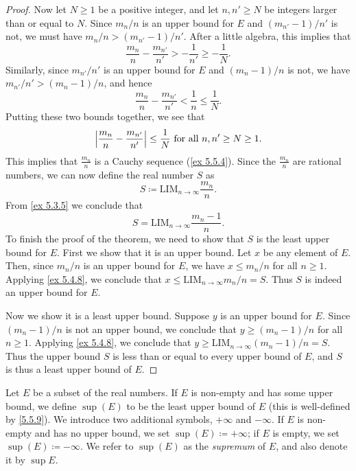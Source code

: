 \begin{proof}
  Now let \(N \geq 1\) be a positive integer, and let \(n, n' \geq N\) be integers larger than or equal to \(N\).
  Since \(m_n / n\) is an upper bound for \(E\) and \((m_{n'} - 1) / n'\) is not, we must have \(m_n / n > (m_{n'} - 1) / n'\).
  After a little algebra, this implies that
  \[
    \frac{m_n}{n} - \frac{m_{n'}}{n'} > -\frac{1}{n'} \geq -\frac{1}{N}.
  \]
  Similarly, since \(m_{n'} / n'\) is an upper bound for \(E\) and \((m_n - 1) / n\) is not, we have \(m_{n'} / n' > (m_n - 1) / n\), and hence
  \[
    \frac{m_n}{n} - \frac{m_{n'}}{n'} < \frac{1}{n} \leq \frac{1}{N}.
  \]
  Putting these two bounds together, we see that
  \[
    \left\lvert\frac{m_n}{n} - \frac{m_{n'}}{n'}\right\rvert \leq \frac{1}{N} \text{ for all } n, n' \geq N \geq 1.
  \]
  This implies that \(\frac{m_n}{n}\) is a Cauchy sequence (\cref{ex 5.5.4}).
  Since the \(\frac{m_n}{n}\) are rational numbers, we can now define the real number \(S\) as
  \[
    S \coloneqq \text{LIM}_{n \to \infty} \frac{m_n}{n}.
  \]
  From \cref{ex 5.3.5} we conclude that
  \[
    S = \text{LIM}_{n \to \infty} \frac{m_n - 1}{n}.
  \]
  To finish the proof of the theorem, we need to show that \(S\) is the least upper bound for \(E\).
  First we show that it is an upper bound.
  Let \(x\) be any element of \(E\).
  Then, since \(m_n / n\) is an upper bound for \(E\), we have \(x \leq m_n / n\) for all \(n \geq 1\).
  Applying \cref{ex 5.4.8}, we conclude that \(x \leq \text{LIM}_{n \to \infty} m_n / n = S\).
  Thus \(S\) is indeed an upper bound for \(E\).

  Now we show it is a least upper bound.
  Suppose \(y\) is an upper bound for \(E\).
  Since \((m_n - 1) / n\) is not an upper bound, we conclude that \(y \geq (m_n - 1) / n\) for all \(n \geq 1\).
  Applying \cref{ex 5.4.8}, we conclude that \(y \geq \text{LIM}_{n \to \infty} (m_n - 1) / n = S\).
  Thus the upper bound \(S\) is less than or equal to every upper bound of \(E\), and \(S\) is thus a least upper bound of \(E\).
\end{proof}

\begin{definition}[Supremum]\label{5.5.10}
  Let \(E\) be a subset of the real numbers.
  If \(E\) is non-empty and has some upper bound, we define \(\sup(E)\) to be the least upper bound of \(E\)
  (this is well-defined by \cref{5.5.9}).
  We introduce two additional symbols, \(+\infty\) and \(-\infty\).
  If \(E\) is non-empty and has no upper bound, we set \(\sup(E) \coloneqq +\infty\);
  if \(E\) is empty, we set \(\sup(E) \coloneqq -\infty\).
  We refer to \(\sup(E)\) as the \emph{supremum} of \(E\), and also denote it by \(\sup E\).
\end{definition}


